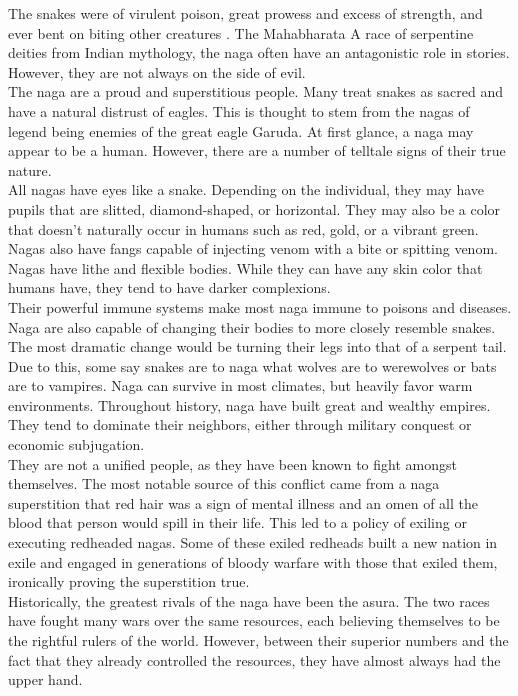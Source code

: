 ﻿
{The snakes were of virulent poison, great prowess and excess of strength, and ever bent on biting other creatures .}
{The Mahabharata}
{A race of serpentine deities from Indian mythology, the naga often have an antagonistic role in stories. However, they are not always on the side of evil.\\
The naga are a proud and superstitious people. Many treat snakes as sacred and have a natural distrust of eagles. This is thought to stem from the nagas of legend being enemies of the great eagle Garuda.}
{At first glance, a naga may appear to be a human. However, there are a number of telltale signs of their true nature.\\
All nagas have eyes like a snake. Depending on the individual, they may have pupils that are slitted, diamond-shaped, or horizontal. They may also be a color that doesn't naturally occur in humans such as red, gold, or a vibrant green.\\
Nagas also have fangs capable of injecting venom with a bite or spitting venom.\\
Nagas have lithe and flexible bodies. While they can have any skin color that humans have, they tend to have darker complexions.\\
Their powerful immune systems make most naga immune to poisons and diseases.\\
Naga are also capable of changing their bodies to more closely resemble snakes. The most dramatic change would be turning their legs into that of a serpent tail.\\
Due to this, some say snakes are to naga what wolves are to werewolves or bats are to vampires.}
{Naga can survive in most climates, but heavily favor warm environments.}
{Throughout history, naga have built great and wealthy empires. They tend to dominate their neighbors, either through military conquest or economic subjugation.\\
They are not a unified people, as they have been known to fight amongst themselves. The most notable source of this conflict came from a naga superstition that red hair was a sign of mental illness and an omen of all the blood that person would spill in their life. This led to a policy of exiling or executing redheaded nagas. Some of these exiled redheads built a new nation in exile and engaged in generations of bloody warfare with those that exiled them, ironically proving the superstition true.\\
Historically, the greatest rivals of the naga have been the asura. The two races have fought many wars over the same resources, each believing themselves to be the rightful rulers of the world. However, between their superior numbers and the fact that they already controlled the resources, they have almost always had the upper hand.}
